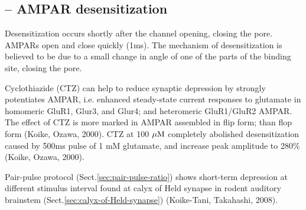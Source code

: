 \subsection{-- AMPAR desensitization}
\label{sec:AMPAR-desensitization}

Desensitization occurs shortly after the channel opening, closing the pore.
AMPARs open and close quickly (1ms). The mechanism of desensitization is
believed to be due to a small change in angle of one of the parts of the binding
site, closing the pore.


Cyclothiazide (CTZ) can help to reduce synaptic depression by strongly
potentiates AMPAR, i.e. enhanced steady-state current responses to glutamate in
homomeric GluR1, Glur3, and Glur4; and heteromeric GluR1/GluR2 AMPAR. The effect
of CTZ is more marked in AMPAR assembled in flip form; than flop form (Koike,
Ozawa, 2000). CTZ at 100 ${\mu\text{M}}$ completely abolished desensitization caused by
500ms pulse of 1 mM glutamate, and increase peak amplitude to 280\% (Koike,
Ozawa, 2000).

Pair-pulse protocol (Sect.\ref{sec:pair-pulse-ratio}) shows short-term
depression at different stimulus interval found at calyx of Held synapse in
rodent auditory brainstem (Sect.\ref{sec:calyx-of-Held-synapse}) (Koike-Tani,
Takahashi, 2008).

